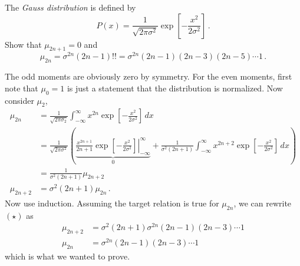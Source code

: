 

The \emph{Gauss distribution} is defined by
\begin{equation*}
P(x) = \frac{1}{\sqrt{2\pi \sigma^2}} \exp \left[ - \frac{x^2}{2 \sigma^2} \right] \, .
\end{equation*}
Show that $\mu_{2n+1} = 0$ and
\begin{equation*}
\mu_{2n} = \sigma^{2n} (2n-1)!! = \sigma^{2n} (2n-1)(2n-3)(2n-5)\cdots 1 \, .
\end{equation*}


The odd moments are obviously zero by symmetry.
For the even moments, first note that $\mu_0 = 1$ is just a statement that the distribution is normalized.
Now consider $\mu_2$,
\begin{align*}
\mu_{2n}
&= \frac{1}{\sqrt{2\pi \sigma_2}} \int_{-\infty}^\infty x^{2n} \exp \left[ - \frac{x^2}{2 \sigma^2} \right] \, dx \\
&= \frac{1}{\sqrt{2 \pi \sigma^2}}
\left(
\underbrace{
\left. \frac{x^{2n + 1}}{2n+1} \exp \left[ - \frac{x^2}{2 \sigma^2} \right]
\right\rvert_{-\infty}^\infty
}_0
+ \frac{1}{\sigma^2 (2n + 1)}
\int_{-\infty}^\infty x^{2n+2} \exp \left[ - \frac{x^2}{2 \sigma^2} \right] \, dx
\right) \\
&= \frac{1}{\sigma^2 (2n + 1)} \mu_{2n + 2} \\
\mu_{2n + 2} &= \sigma^2 (2n + 1) \mu_{2n} \, . \tag{$\star$}
\end{align*}
Now use induction.
Assuming the target relation is true for $\mu_{2n}$, we can rewrite $(\star)$ as
\begin{align*}
\mu_{2n + 2} &= \sigma^2 (2n + 1) \sigma^{2n} (2n - 1)(2n - 3)\cdots 1 \\
\mu_{2n} &= \sigma^{2n} (2n - 1)(2n - 3) \cdots 1
\end{align*}
which is what we wanted to prove.
